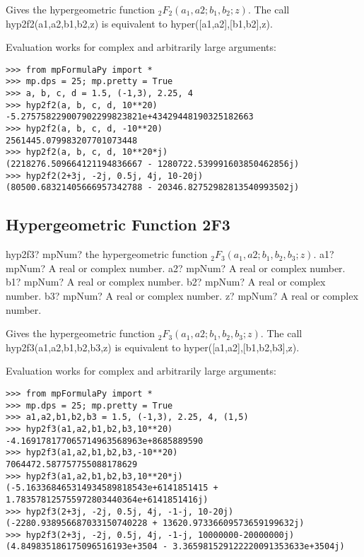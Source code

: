 \vpara
Gives the hypergeometric function ${}_2F_2(a_1,a2;b_1,b_2;z)$. The call hyp2f2(a1,a2,b1,b2,z) is equivalent to hyper([a1,a2],[b1,b2],z).

Evaluation works for complex and arbitrarily large arguments:

\begin{lstlisting}
>>> from mpFormulaPy import *
>>> mp.dps = 25; mp.pretty = True
>>> a, b, c, d = 1.5, (-1,3), 2.25, 4
>>> hyp2f2(a, b, c, d, 10**20)
-5.275758229007902299823821e+43429448190325182663
>>> hyp2f2(a, b, c, d, -10**20)
2561445.079983207701073448
>>> hyp2f2(a, b, c, d, 10**20*j)
(2218276.509664121194836667 - 1280722.539991603850462856j)
>>> hyp2f2(2+3j, -2j, 0.5j, 4j, 10-20j)
(80500.68321405666957342788 - 20346.82752982813540993502j)
\end{lstlisting}



\subsection{Hypergeometric Function 2F3}

\begin{mpFunctionsExtract}
	\mpFunctionSix
	{hyp2f3? mpNum? the hypergeometric function ${}_2F_3(a_1,a2;b_1,b_2,b_3;z)$.}
	{a1? mpNum? A real or complex number.}
	{a2? mpNum? A real or complex number.}
	{b1? mpNum? A real or complex number.}
	{b2? mpNum? A real or complex number.}	
	{b3? mpNum? A real or complex number.}	
	{z? mpNum? A real or complex number.}
\end{mpFunctionsExtract}

\vpara
Gives the hypergeometric function ${}_2F_3(a_1,a2;b_1,b_2,b_3;z)$. The call hyp2f3(a1,a2,b1,b2,b3,z) is equivalent to hyper([a1,a2],[b1,b2,b3],z).

Evaluation works for complex and arbitrarily large arguments:

\begin{lstlisting}
>>> from mpFormulaPy import *
>>> mp.dps = 25; mp.pretty = True
>>> a1,a2,b1,b2,b3 = 1.5, (-1,3), 2.25, 4, (1,5)
>>> hyp2f3(a1,a2,b1,b2,b3,10**20)
-4.169178177065714963568963e+8685889590
>>> hyp2f3(a1,a2,b1,b2,b3,-10**20)
7064472.587757755088178629
>>> hyp2f3(a1,a2,b1,b2,b3,10**20*j)
(-5.163368465314934589818543e+6141851415 + 1.783578125755972803440364e+6141851416j)
>>> hyp2f3(2+3j, -2j, 0.5j, 4j, -1-j, 10-20j)
(-2280.938956687033150740228 + 13620.97336609573659199632j)
>>> hyp2f3(2+3j, -2j, 0.5j, 4j, -1-j, 10000000-20000000j)
(4.849835186175096516193e+3504 - 3.365981529122220091353633e+3504j)
\end{lstlisting}




